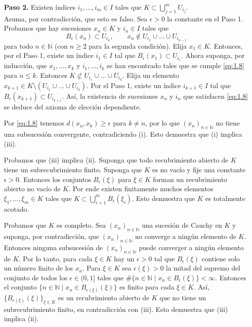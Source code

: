 \noindent \textbf{Paso 2.} Existen índices $i_{1},\dots,i_{m}\in I$ tales que $K\subset\bigcup_{j=1}^{m}U_{i_{j}}$.
\\ Asuma, por contradicción, que esto es falso. Sea $\epsilon>0$ la constante en el Paso 1. Probamos que hay sucesiones $x_{n}\in K$ y $i_{n}\in I$ tales que
\begin{equation}\label{eq:1.8}
B_{\epsilon}(x_{n})\subset U_{i_{n}}, \qquad x_{n}\notin U_{i_{1}}\cup\dots\cup U_{i_{n-1}}
\end{equation}
para todo $n\in\mathbb{N}$ (con $n\ge 2$ para la segunda condición). Elija $x_{1}\in K$. Entonces, por el Paso 1, existe un índice $i_{1}\in I$ tal que $B_{\epsilon}(x_{1})\subset U_{i_{1}}$. Ahora suponga, por inducción, que $x_{1},\dots,x_{k}$ y $i_{1},\dots,i_{k}$ se han encontrado tales que se cumple \eqref{eq:1.8} para $n\le k$. Entonces $K\not\subset U_{i_{1}}\cup\dots\cup U_{i_{k}}$. Elija un elemento $x_{k+1}\in K\setminus(U_{i_{1}}\cup\dots\cup U_{i_{k}})$. Por el Paso 1, existe un índice $i_{k+1}\in I$ tal que $B_{\epsilon}(x_{k+1})\subset U_{i_{k+1}}$. Así, la existencia de sucesiones $x_{n}$ y $i_{n}$ que satisfacen \eqref{eq:1.8} se deduce del axioma de elección dependiente.

Por \eqref{eq:1.8} tenemos $d(x_{n},x_{k})\ge\epsilon$ para $k\ne n$, por lo que $(x_{n})_{n\in\mathbb{N}}$ no tiene una subsucesión convergente, contradiciendo (i). Esto demuestra que (i) implica (iii).

Probamos que (iii) implica (ii). Suponga que todo recubrimiento abierto de $K$ tiene un subrecubrimiento finito. Suponga que $K$ es no vacío y fije una constante $\epsilon>0$. Entonces los conjuntos $B_{\epsilon}(\xi)$ para $\xi\in K$ forman un recubrimiento abierto no vacío de $K$. Por ende existen finitamente muchos elementos $\xi_{1},\dots,\xi_{m}\in K$ tales que $K\subset\bigcup_{i=1}^{m}B_{\epsilon}(\xi_{i})$. Esto demuestra que $K$ es totalmente acotado.

Probamos que $K$ es completo. Sea $(x_{n})_{n\in\mathbb{N}}$ una sucesión de Cauchy en $K$ y suponga, por contradicción, que $(x_{n})_{n\in\mathbb{N}}$ no converge a ningún elemento de $K$. Entonces ninguna subsucesión de $(x_{n})_{n\in\mathbb{N}}$ puede converger a ningún elemento de $K$. Por lo tanto, para cada $\xi\in K$ hay un $\epsilon>0$ tal que $B_{\epsilon}(\xi)$ contiene solo un número finito de los $x_{n}$. Para $\xi\in K$ sea $\epsilon(\xi)>0$ la mitad del supremo del conjunto de todos los $\epsilon\in(0,1]$ tales que $\#\{n\in\mathbb{N} \mid x_{n}\in B_{\epsilon}(\xi)\}<\infty$. Entonces el conjunto $\{n\in\mathbb{N} \mid x_{n}\in B_{\epsilon(\xi)}(\xi)\}$ es finito para cada $\xi\in K$. Así, $\{B_{\epsilon(\xi)}(\xi)\}_{\xi\in K}$ es un recubrimiento abierto de $K$ que no tiene un subrecubrimiento finito, en contradicción con (iii). Esto demuestra que (iii) implica (ii).

